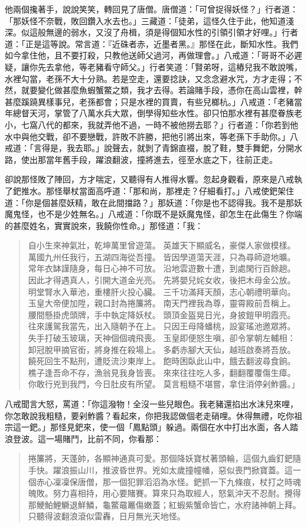 他兩個攙著手，說說笑笑，轉回見了唐僧。唐僧道：「可曾捉得妖怪？」行者道：「那妖怪不奈戰，敗回鑽入水去也。」三藏道：「徒弟，這怪久住于此，他知道淺深。似這般無邊的弱水，又沒了舟楫，須是得個知水性的引領引領才好哩。」行者道：「正是這等說。常言道：『近硃者赤，近墨者黑。』那怪在此，斷知水性。我們如今拿住他，且不要打殺，只教他送師父過河，再做理會。」八戒道：「哥哥不必遲疑，讓你先去拿他，等老豬看守師父。」行者笑道：「賢弟呀，這樁兒我不敢說嘴，水裡勾當，老孫不大十分熟。若是空走，還要捻訣，又念念避水咒，方才走得；不然，就要變化做甚麼魚蝦蟹鱉之類，我才去得。若論賭手段，憑你在高山雲裡，幹甚麼蹊蹺異樣事兒，老孫都會；只是水裡的買賣，有些兒榔杭。」八戒道：「老豬當年總督天河，掌管了八萬水兵大眾，倒學得知些水性。卻只怕那水裡有甚麼眷族老小，七窩八代的都來，我就弄他不過，一時不被他撈去耶？」行者道：「你若到他水中與他交戰，卻不要戀戰，許敗不許勝，把他引將出來，等老孫下手助你。」八戒道：「言得是，我去耶。」說聲去，就剝了青錦直裰，脫了鞋，雙手舞鈀，分開水路，使出那當年舊手段，躍浪翻波，撞將進去，徑至水底之下，往前正走。

卻說那怪敗了陣回，方才喘定，又聽得有人推得水響。忽起身觀看，原來是八戒執了鈀推水。那怪舉杖當面高呼道：「那和尚，那裡走？仔細看打。」八戒使鈀架住道：「你是個甚麼妖精，敢在此間擋路？」那妖道：「你是也不認得我。我不是那妖魔鬼怪，也不是少姓無名。」八戒道：「你既不是妖魔鬼怪，卻怎生在此傷生？你端的甚麼姓名，實實說來，我饒你性命。」那怪道：「我：
\begin{quote}
自小生來神氣壯，乾坤萬里曾遊蕩。
英雄天下顯威名，豪傑人家做模樣。
萬國九州任我行，五湖四海從吾撞。
皆因學道蕩天涯，只為尋師遊地曠。
常年衣缽謹隨身，每日心神不可放。
沿地雲遊數十遭，到處閑行百餘趟。
因此才得遇真人，引開大道金光亮。
先將嬰兒姹女收，後把木母金公放。
明堂腎水入華池，重樓肝火投心臟。
三千功滿拜天顏，志心朝禮明華向。
玉皇大帝便加陞，親口封為捲簾將。
南天門裡我為尊，靈霄殿前吾稱上。
腰間懸掛虎頭牌，手中執定降妖杖。
頭頂金盔晃日光，身披鎧甲明霞亮。
往來護駕我當先，出入隨朝予在上。
只因王母降蟠桃，設宴瑤池邀眾將。
失手打破玉玻璃，天神個個魂飛喪。
玉皇即便怒生嗔，卻令掌朝左輔相：
卸冠脫甲摘官銜，將身推在殺場上。
多虧赤腳大天仙，越班啟奏將吾放。
饒死回生不點刑，遭貶流沙東岸上。
飽時困臥此山中，餓去翻波尋食餉。
樵子逢吾命不存，漁翁見我身皆喪。
來來往往吃人多，翻翻覆覆傷生瘴。
你敢行兇到我門，今日肚皮有所望。
莫言粗糙不堪嘗，拿住消停剁鮓醬。」
\end{quote}

八戒聞言大怒，罵道：「你這潑物！全沒一些兒眼色。我老豬還掐出水沫兒來哩，你怎敢說我粗糙，要剁鮓醬？看起來，你把我認做個老走硝哩。休得無禮，吃你祖宗這一鈀。」那怪見鈀來，使一個「鳳點頭」躲過。兩個在水中打出水面，各人踏浪登波。這一場賭鬥，比前不同，你看那：
\begin{quote}
捲簾將，天蓬帥，各顯神通真可愛。那個降妖寶杖著頭輪，這個九齒釘鈀隨手快。躍浪振山川，推波昏世界。兇如太歲撞幢幡，惡似喪門掀寶蓋。這一個赤心凜凜保唐僧，那一個犯罪滔滔為水怪。鈀抓一下九條痕，杖打之時魂魄敗。努力喜相持，用心要賭賽。算來只為取經人，怒氣沖天不忍耐。攪得那鯁鮊鯉鱖退鮮鱗，龜鱉黿鼉傷嫩蓋；紅蝦紫蟹命皆亡，水府諸神朝上拜。只聽得波翻浪滾似雷轟，日月無光天地怪。
\end{quote}

